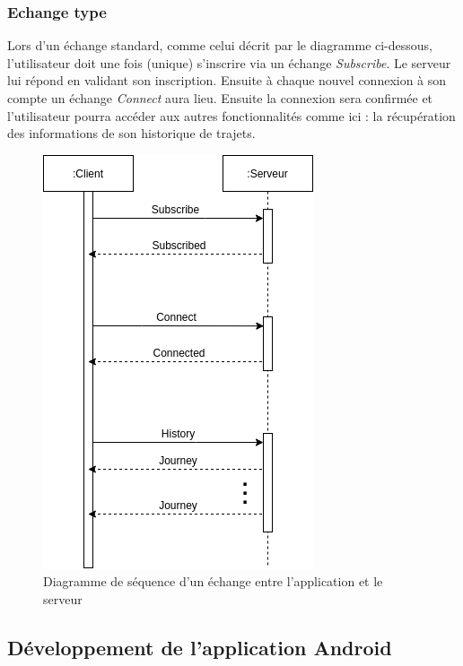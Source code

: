   \subsubsection{Echange type}
  Lors d'un échange standard, comme celui décrit par le diagramme ci-dessous, l'utilisateur doit une fois (unique) s'inscrire via un échange \emph{Subscribe}. Le serveur lui répond en validant son inscription.
  Ensuite à chaque nouvel connexion à son compte un échange \emph{Connect} aura lieu. Ensuite la connexion sera confirmée et l'utilisateur pourra accéder aux autres fonctionnalités comme ici : la récupération des informations de son historique de trajets.
  \begin{figure}[ht]
    \label{Diagramme}
    \centering
    \includegraphics[scale=0.8]{images/protocole.png}
    \caption{Diagramme de séquence d'un échange entre l'application et le serveur}
  \end{figure}

\newpage
\subsection{Développement de l'application Android}
